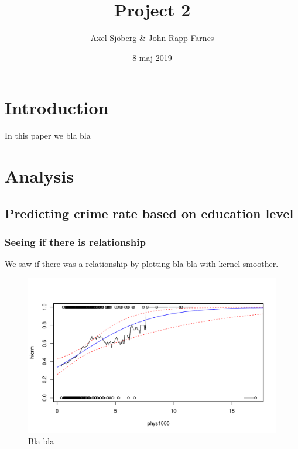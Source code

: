 \documentclass[a4paper]{article}
\title{Project 2}
\author{Axel Sjöberg \& John Rapp Farnes}
\date{8 maj 2019}
\begin{document}
\maketitle

{
\setcounter{tocdepth}{3}
\tableofcontents
}
\newpage

\hypertarget{introduction}{%
\section{Introduction}\label{introduction}}

In this paper we bla bla

\hypertarget{analysis}{%
\section{Analysis}\label{analysis}}

\hypertarget{predicting-crime-rate-based-on-education-level}{%
\subsection{Predicting crime rate based on education
level}\label{predicting-crime-rate-based-on-education-level}}

\hypertarget{seeing-if-there-is-relationship}{%
\subsubsection{Seeing if there is
relationship}\label{seeing-if-there-is-relationship}}

We saw if there was a relationship by plotting bla bla with kernel
smoother.

\begin{figure}[h]
\includegraphics{Project_2_files/figure-latex/code_plot-1} \caption{Bla bla}\label{fig:code_plot}
\end{figure}
\end{document}
